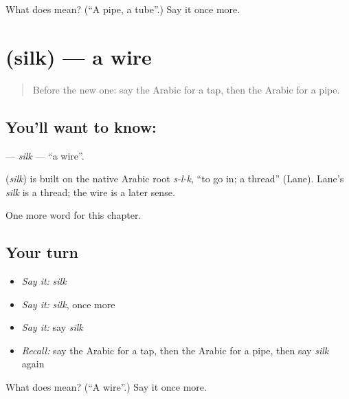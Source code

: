 \begin{tcolorbox}[breakable,colback=teal!4,colframe=teal!35!black,title={Before you move on}]
What does  mean? (\textquotedblleft{}A pipe, a tube\textquotedblright{}.) Say it once more.
\end{tcolorbox}
\section[\texorpdfstring{\ar{سلك} (silk)}{سلك (silk)}]{ (silk) — a wire}

\label{lesson:AR-C187-silk}



\begin{quote}
Before the new one: say the Arabic for a tap, then the Arabic for a pipe.
\end{quote}

\subsection*{You'll want to know: }
\textbf{} — \emph{silk} — \textquotedblleft{}a wire\textquotedblright{}.

\begin{cousinweb}
\textbf{} (\emph{silk}) is built on the native Arabic root \emph{s-l-k}, \textquotedblleft{}to go in; a thread\textquotedblright{} (Lane). Lane's \emph{silk} is a thread; the wire is a later sense.
\end{cousinweb}

\begin{grammarlens}[title={What you've built}]
One more word for this chapter.
\end{grammarlens}

\subsection*{Your turn}
\begin{itemize}
\raggedright
  \item \emph{Say it:} \emph{silk}
  \item \emph{Say it:} \emph{silk}, once more
  \item \emph{Say it:} say \emph{silk}
  \item \emph{Recall:} say the Arabic for a tap, then the Arabic for a pipe, then say \emph{silk} again
\end{itemize}

\begin{tcolorbox}[breakable,colback=teal!4,colframe=teal!35!black,title={Before you move on}]
What does  mean? (\textquotedblleft{}A wire\textquotedblright{}.) Say it once more.
\end{tcolorbox}
